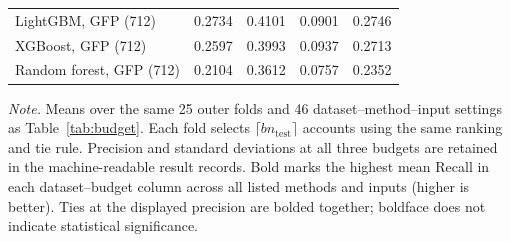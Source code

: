 \begin{table}[htbp]
\begin{threeparttable}
\begin{tabular}{lcccc}
\addlinespace
LightGBM, GFP (712) & 0.2734 & 0.4101 & 0.0901 & 0.2746 \\
XGBoost, GFP (712) & 0.2597 & 0.3993 & 0.0937 & 0.2713 \\
Random forest, GFP (712) & 0.2104 & 0.3612 & 0.0757 & 0.2352 \\
\bottomrule
\end{tabular}
\begin{tablenotes}[flushleft]
\footnotesize
\setlength{\labelsep}{0pt}\item[] \textit{Note.} Means over the same 25 outer folds and 46 dataset--method--input settings as Table~\ref{tab:budget}. Each fold selects $\lceil b n_{\mathrm{test}}\rceil$ accounts using the same ranking and tie rule. Precision and standard deviations at all three budgets are retained in the machine-readable result records. Bold marks the highest mean Recall in each dataset--budget column across all listed methods and inputs (higher is better). Ties at the displayed precision are bolded together; boldface does not indicate statistical significance.
\end{tablenotes}
\end{threeparttable}
\end{table}
